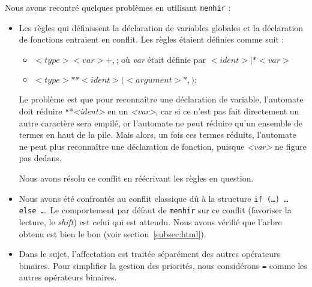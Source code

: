 \documentclass[a4paper]{article}
\begin{document}
Nous avons recontré quelques problèmes en utilisant \texttt{menhir} :
\begin{itemize}
    \item Les règles qui définissent la déclaration de variables globales et la déclaration de fonctions entraient en conflit.
          Les règles étaient définies comme suit :
          \begin{itemize}
              \item $<type> <var>+,\texttt{;}$ où \emph{var} était définie par $<ident> | \texttt{*} <var>$
              \item $<type> \texttt{*}* <ident>\texttt{(} <argument>*, \texttt{);}$
          \end{itemize}
          Le problème est que pour reconnaître une déclaration de variable, l'automate doit réduire \texttt{*}*\emph{<ident>} en un \emph{<var>}, car si ce n'est pas fait directement un autre caractère sera empilé, or l'automate ne peut réduire qu'un ensemble de termes en haut de la pile. Mais alors, un fois ces termes réduits, l'automate ne peut plus reconnaître une déclaration de fonction, puisque \emph{<var>} ne figure pas dedans.

          Nous avons résolu ce conflit en réécrivant les règles en question.

      \item Nous avons été confrontés au conflit classique dû à la structure \texttt{if (…) … else …}.
            Le comportement par défaut de \texttt{menhir} sur ce conflit (favoriser la lecture, le \emph{shift}) est celui qui est attendu. Nous avons vérifié que l'arbre obtenu est bien le bon (voir section~\ref{subsec:html}).
      \item Dans le sujet, l'affectation est traitée séparément des
autres opérateurs binaires.
Pour simplifier la gestion des priorités, nous considérons \texttt{=}
comme les autres opérateurs binaires.
\end{itemize}
\end{document}
